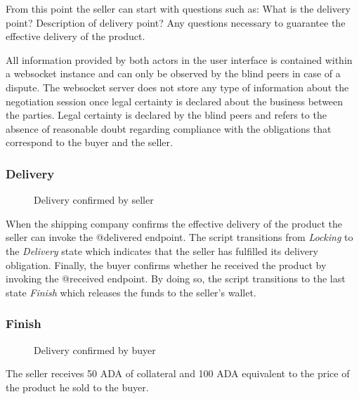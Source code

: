 \documentclass[12pt]{article}
\begin{document}
From this point the seller can start with questions such as: What is the delivery point? Description of delivery point? Any questions necessary to guarantee the effective delivery of the product.

All information provided by both actors in the user interface is contained within a websocket instance and can only be observed by the blind peers in case of a dispute.
The websocket server does not store any type of information about the negotiation session once legal certainty is declared about the business between the parties.
Legal certainty is declared by the blind peers and refers to the absence of reasonable doubt regarding compliance with the obligations that correspond to the buyer and the seller.


\subsubsection { Delivery }


\begin{figure}[ht]
  \centering
  
  \caption{Delivery confirmed by seller}  
  \label{fig:delivered}
\end{figure}





When the shipping company confirms the effective delivery of the product the seller can invoke the @delivered endpoint.
The script transitions from \emph{Locking} to the \emph{Delivery} state which indicates that the seller has fulfilled its delivery obligation.
Finally, the buyer confirms whether he received the product by invoking the @received endpoint. By doing so, the script transitions to the last state \emph{Finish} which releases the funds to the seller's wallet.


\subsubsection { Finish }

\begin{figure}[ht]
  \centering
  
  \caption{Delivery confirmed by buyer}
  \label{fig:delivered}
\end{figure}

The seller receives 50 ADA of collateral and 100 ADA equivalent to the price of the product he sold to the buyer.
\\
\\
\\
\\
\\
\\
\\
\\
\\
\\
\\
\\
\\
\\
\\
\\
\\
\end{document}

